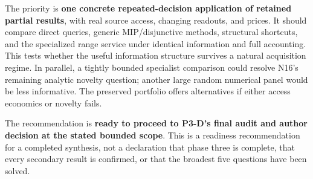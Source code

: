 \documentclass{article}
\theoremstyle{definition}
\begin{document}
The priority is \textbf{one concrete repeated-decision application of
retained partial results}, with real source access, changing readouts,
and prices. It should compare direct queries, generic MIP/disjunctive
methods, structural shortcuts, and the specialized range service under
identical information and full accounting. This tests whether the useful
information structure survives a natural acquisition regime. In
parallel, a tightly bounded specialist comparison could resolve N16's
remaining analytic novelty question; another large random numerical
panel would be less informative. The preserved portfolio offers
alternatives if either access economics or novelty fails.

The recommendation is \textbf{ready to proceed to P3-D's final audit and
author decision at the stated bounded scope}. This is a readiness
recommendation for a completed synthesis, not a declaration that phase
three is complete, that every secondary result is confirmed, or that the
broadest five questions have been solved.


\end{document}

